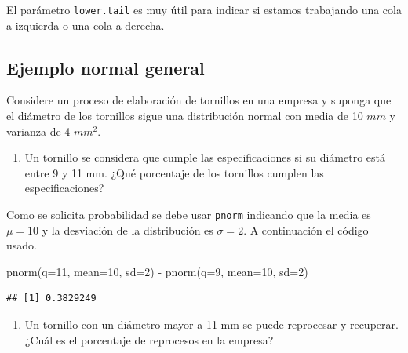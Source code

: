 \documentclass[
]{book}
\makeatletter
\newenvironment{Shaded}{\begin{snugshade}}{\end{snugshade}}
\newcommand{\AttributeTok}[1]{\textcolor[rgb]{0.77,0.63,0.00}{#1}}
\newcommand{\DecValTok}[1]{\textcolor[rgb]{0.00,0.00,0.81}{#1}}
\newcommand{\FunctionTok}[1]{\textcolor[rgb]{0.00,0.00,0.00}{#1}}
\newcommand{\NormalTok}[1]{#1}
\newcommand{\SpecialCharTok}[1]{\textcolor[rgb]{0.00,0.00,0.00}{#1}}
\providecommand{\tightlist}{%
  \setlength{\itemsep}{0pt}\setlength{\parskip}{0pt}}
\newenvironment{kframe}{%
\medskip{}
\setlength{\fboxsep}{.8em}
 \def\at@end@of@kframe{}%
 \ifinner\ifhmode%
  \def\at@end@of@kframe{\end{minipage}}%
  \begin{minipage}{\columnwidth}%
 \fi\fi%
 \def\FrameCommand##1{\hskip\@totalleftmargin \hskip-\fboxsep
 \colorbox{shadecolor}{##1}\hskip-\fboxsep
     \hskip-\linewidth \hskip-\@totalleftmargin \hskip\columnwidth}%
 \MakeFramed {\advance\hsize-\width
   \@totalleftmargin\z@ \linewidth\hsize
   \@setminipage}}%
 {\par\unskip\endMakeFramed%
 \at@end@of@kframe}
\renewenvironment{Shaded}{\begin{kframe}}{\end{kframe}}
\newenvironment{rmdblock}[1]
  {
  \begin{itemize}
  \renewcommand{\labelitemi}{
    \raisebox{-.7\height}[0pt][0pt]{
      {\setkeys{Gin}{width=3em,keepaspectratio}\texttt{[image: images/\#1]}}
    }
  }
  \setlength{\fboxsep}{1em}
  \begin{kframe}
  \item
  }
  {
  \end{kframe}
  \end{itemize}
  }
\newenvironment{rmdtip}
  {\begin{rmdblock}{tip}}
  {\end{rmdblock}}
\makeatother
\begin{document}
\begin{rmdtip}
El parámetro \texttt{lower.tail} es muy útil para indicar si estamos trabajando una cola a izquierda o una cola a derecha.
\end{rmdtip}

\hypertarget{ejemplo-normal-general}{%
\subsection*{Ejemplo normal general}\label{ejemplo-normal-general}}

Considere un proceso de elaboración de tornillos en una empresa y suponga que el diámetro de los tornillos sigue una distribución normal con media de 10 \(mm\) y varianza de 4 \(mm^2\).

\begin{enumerate}
\def\labelenumi{\arabic{enumi})}
\tightlist
\item
  Un tornillo se considera que cumple las especificaciones si su diámetro está entre 9 y 11 mm. ¿Qué porcentaje de los tornillos cumplen las especificaciones?
\end{enumerate}

Como se solicita probabilidad se debe usar \texttt{pnorm} indicando que la media es \(\mu=10\) y la desviación de la distribución es \(\sigma=2\). A continuación el código usado.

\begin{Shaded}
\begin{Highlighting}[]
\FunctionTok{pnorm}\NormalTok{(}\AttributeTok{q=}\DecValTok{11}\NormalTok{, }\AttributeTok{mean=}\DecValTok{10}\NormalTok{, }\AttributeTok{sd=}\DecValTok{2}\NormalTok{) }\SpecialCharTok{{-}} \FunctionTok{pnorm}\NormalTok{(}\AttributeTok{q=}\DecValTok{9}\NormalTok{, }\AttributeTok{mean=}\DecValTok{10}\NormalTok{, }\AttributeTok{sd=}\DecValTok{2}\NormalTok{)}
\end{Highlighting}
\end{Shaded}

\begin{verbatim}
## [1] 0.3829249
\end{verbatim}

\begin{enumerate}
\def\labelenumi{\arabic{enumi})}
\setcounter{enumi}{1}
\tightlist
\item
  Un tornillo con un diámetro mayor a 11 mm se puede reprocesar y recuperar. ¿Cuál es el porcentaje de reprocesos en la empresa?
\end{enumerate}
\end{document}
